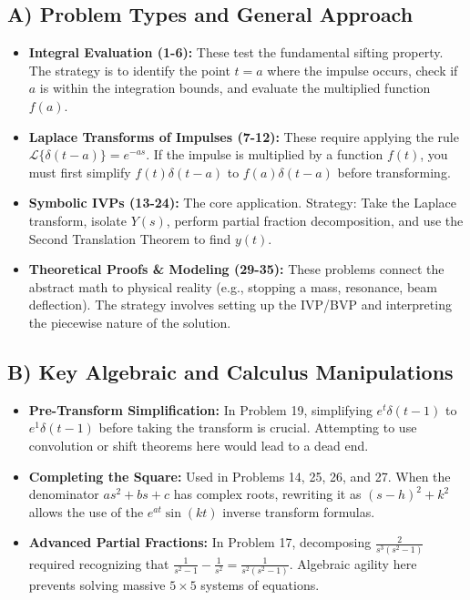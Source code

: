 \documentclass[11pt, letterpaper]{article}
\theoremstyle{definition}
\theoremstyle{remark}
\newcommand{\Laplace}{\mathcal{L}}
\begin{document}
\subsection{A) Problem Types and General Approach}
\begin{itemize}
    \item \textbf{Integral Evaluation (1-6):} These test the fundamental sifting property. The strategy is to identify the point $t=a$ where the impulse occurs, check if $a$ is within the integration bounds, and evaluate the multiplied function $f(a)$.
    \item \textbf{Laplace Transforms of Impulses (7-12):} These require applying the rule $\Laplace\{\delta(t-a)\} = e^{-as}$. If the impulse is multiplied by a function $f(t)$, you must first simplify $f(t)\delta(t-a)$ to $f(a)\delta(t-a)$ before transforming.
    \item \textbf{Symbolic IVPs (13-24):} The core application. Strategy: Take the Laplace transform, isolate $Y(s)$, perform partial fraction decomposition, and use the Second Translation Theorem to find $y(t)$.
    \item \textbf{Theoretical Proofs \& Modeling (29-35):} These problems connect the abstract math to physical reality (e.g., stopping a mass, resonance, beam deflection). The strategy involves setting up the IVP/BVP and interpreting the piecewise nature of the solution.
\end{itemize}

\subsection{B) Key Algebraic and Calculus Manipulations}
\begin{itemize}
    \item \textbf{Pre-Transform Simplification:} In Problem 19, simplifying $e^t\delta(t-1)$ to $e^1\delta(t-1)$ before taking the transform is crucial. Attempting to use convolution or shift theorems here would lead to a dead end.
    \item \textbf{Completing the Square:} Used in Problems 14, 25, 26, and 27. When the denominator $as^2+bs+c$ has complex roots, rewriting it as $(s-h)^2 + k^2$ allows the use of the $e^{at}\sin(kt)$ inverse transform formulas.
    \item \textbf{Advanced Partial Fractions:} In Problem 17, decomposing $\frac{2}{s^3(s^2-1)}$ required recognizing that $\frac{1}{s^2-1} - \frac{1}{s^2} = \frac{1}{s^2(s^2-1)}$. Algebraic agility here prevents solving massive $5 \times 5$ systems of equations.
\end{itemize}
\end{document}
